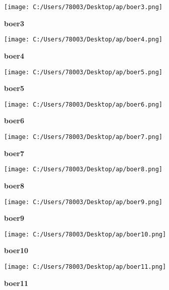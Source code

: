 \documentclass[UTF8]{report}
\theoremstyle{MyLineTheoremStyle} %
\theoremstyle{MyBlockTheoremStyle} %
\theoremstyle{MySubsubsectionStyle} %
\begin{document}
\begin{figure}[ht]
    \centering
    \texttt{[image: C:/Users/78003/Desktop/ap/boer3.png]}
    \caption{\textbf{boer3}}
    \label{fig:boer3}
\end{figure}

\begin{figure}[ht]
    \centering
    \texttt{[image: C:/Users/78003/Desktop/ap/boer4.png]}
    \caption{\textbf{boer4}}
    \label{fig:boer4}
\end{figure}

\begin{figure}[ht]
    \centering
    \texttt{[image: C:/Users/78003/Desktop/ap/boer5.png]}
    \caption{\textbf{boer5}}
    \label{fig:boer5}
\end{figure}

\begin{figure}[ht]
    \centering
    \texttt{[image: C:/Users/78003/Desktop/ap/boer6.png]}
    \caption{\textbf{boer6}}
    \label{fig:boer6}
\end{figure}

\begin{figure}[ht]
    \centering
    \texttt{[image: C:/Users/78003/Desktop/ap/boer7.png]}
    \caption{\textbf{boer7}}
    \label{fig:boer7}
\end{figure}

\begin{figure}[ht]
    \centering
    \texttt{[image: C:/Users/78003/Desktop/ap/boer8.png]}
    \caption{\textbf{boer8}}
    \label{fig:boer8}
\end{figure}

\begin{figure}[ht]
    \centering
    \texttt{[image: C:/Users/78003/Desktop/ap/boer9.png]}
    \caption{\textbf{boer9}}
    \label{fig:boer9}
\end{figure}

\begin{figure}[ht]
    \centering
    \texttt{[image: C:/Users/78003/Desktop/ap/boer10.png]}
    \caption{\textbf{boer10}}
    \label{fig:boer10}
\end{figure}

\begin{figure}[ht]
    \centering
    \texttt{[image: C:/Users/78003/Desktop/ap/boer11.png]}
    \caption{\textbf{boer11}}
    \label{fig:boer11}
\end{figure}
\end{document}
